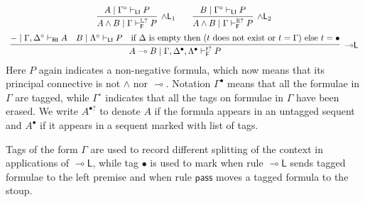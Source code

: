 \documentclass[submission,copyright,creativecommons]{eptcs}
\theoremstyle{definition}
\newcommand{\lleft}{{\multimap}\mathsf{L}}
\newcommand{\pass}{\mathsf{pass}}
\newcommand{\andlone}{\land \mathsf{L}_{1}}
\newcommand{\andltwo}{\land \mathsf{L}_{2}}
\newcommand{\lolli}{\multimap}
\newcommand{\RI}{\mathsf{RI}}
\newcommand{\LI}{\mathsf{LI}}
\newcommand{\F}{\mathsf{F}}
\newcommand{\tL}{\mathbb{L}}
\newcommand{\tR}{\mathbb{R}}
\begin{document}
\begin{equation*}
\begin{array}{lc}
    \multicolumn{2}{c}{
    \infer[\andlone]{A \land B \mid \Gamma \vdash^{\tL?}_{\F} P}{A \mid \Gamma^{\circ} \vdash_{\LI} P}
    \qquad
    \infer[\andltwo]{A \land B \mid \Gamma \vdash^{\tR?}_{\F} P}{B \mid \Gamma^{\circ} \vdash_{\LI} P}
    }
    \\[6pt]
    \multicolumn{2}{c}{
      \infer[\lleft]{A \lolli B \mid \Gamma , \Delta^{\bullet} , \Lambda^{\bullet} \vdash^{t?}_{\F} P}{
        - \mid \Gamma , \Delta^{\circ} \vdash_{\RI} A
        &
        B \mid \Lambda^{\circ} \vdash_{\LI} P
        &
        \text{if } \Delta \text{ is empty then } (t \text{ does not exist or } t =  \Gamma)  \text{ else }  t = \bullet 
      }
    }
  \end{array}
\end{equation*}
Here $P$ again indicates a non-negative formula, which now means that its principal connective is not $\land$ nor $\lolli$. Notation $\Gamma^{\bullet}$ means that all the formulae in $\Gamma$ are tagged, while $\Gamma^{\circ}$ indicates that all the tags on formulae in $\Gamma$ have been erased. We write $A^{\bullet?}$ to denote $A$ if the formula appears in an untagged sequent and $A^\bullet$ if it appears in a sequent marked with list of tags.

Tags of the form $ \Gamma$ are used to record different splitting of the context in applications of $\lleft$, while tag $\bullet$ is used to mark when rule $\lleft$ sends tagged formulae to the left premise and when rule $\pass$ moves a tagged formula to the stoup.
\end{document}
